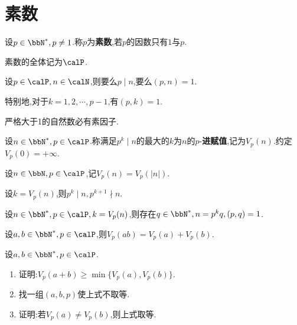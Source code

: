 \section{素数}

\begin{deff}
    设$p \in \bbN^*, p \neq 1$.称$p$为\textbf{素数},若$p$的因数只有$1$与$p$.

    素数的全体记为$\calP$.
\end{deff}

\begin{prop}
    设$p \in \calP, n \in \calN$,则要么$p \mid n$,要么$(p, n) = 1$.

    特别地,对于$k = 1, 2, \cdots, p-1$,有$(p, k) = 1$.
\end{prop}

\begin{prop}
    严格大于1的自然数必有素因子.
\end{prop}

\begin{deff}
    设$n \in \bbN^*, p \in \calP$.称满足$p^k \mid n$的最大的$k$为$n$的$p$-\textbf{进赋值},记为$V_p(n)$.约定$V_p(0) = + \infty$.
\end{deff}

\begin{deff}
    设$n \in \bbN, p \in \calP$,记$V_p(n) = V_p(\left\lvert n \right\rvert)$.
\end{deff}

\begin{prop}
    设$k = V_p(n)$,则$p^k \mid n, p^{k+1} \nmid n$.
\end{prop}

\begin{prop}
    设$n \in \bbN^*, p \in \calP, k = V_p(n)$,则存在$q \in \bbN^*, n = p^kq, (p, q) = 1$.
\end{prop}

\begin{prop}
    设$a, b \in \bbN^*, p \in \calP$,则$V_p(ab) = V_p(a) + V_p(b)$.
\end{prop}

\begin{exer}
    设$a, b \in \bbN^*, p \in \calP$.
    \begin{enumerate}
        \item 证明:$V_p(a + b) \geqslant \min \{ V_p(a), V_p(b) \}$.
        \item 找一组$(a, b, p)$使上式不取等.
        \item 证明:若$V_p(a) \neq V_p(b)$,则上式取等.
    \end{enumerate}
\end{exer}

